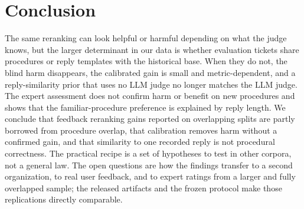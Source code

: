 \section{Conclusion}
\label{sec:conclusion}

The same reranking can look helpful or harmful depending on what the judge knows,
but the larger determinant in our data is whether evaluation tickets share
procedures or reply templates with the historical base. When they do not, the blind
harm disappears, the calibrated gain is small and metric-dependent, and a
reply-similarity prior that uses no LLM judge no longer matches the LLM judge. The
expert assessment does not confirm harm or benefit on new procedures and shows that
the familiar-procedure preference is explained by reply length. We conclude that feedback reranking gains
reported on overlapping splits are partly borrowed from procedure overlap, that
calibration removes harm without a confirmed gain, and that similarity to one
recorded reply is not procedural correctness. The practical recipe is a set of
hypotheses to test in other corpora, not a general law. The open questions are how
the findings transfer to a second organization, to real user feedback, and to
expert ratings from a larger and fully overlapped sample; the released artifacts
and the frozen protocol make those replications directly comparable.
